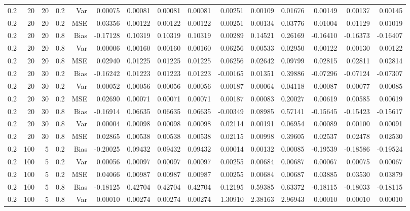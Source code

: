 \begin{table}[!htbp]
\begin{tabular}{lrrrrrrrrrrrrrr}
0.2 &  20 & 20 & 0.2 & Var & 0.00075 & 0.00081 & 0.00081 & 0.00081 & 0.00251 & 0.00109 & 0.01676 & 0.00149 & 0.00137 & 0.00145 \\
0.2 &  20 & 20 & 0.2 & MSE & 0.03356 & 0.00122 & 0.00122 & 0.00122 & 0.00251 & 0.00134 & 0.03776 & 0.01004 & 0.01129 & 0.01019 \\
0.2 &  20 & 20 & 0.8 & Bias & -0.17128 & 0.10319 & 0.10319 & 0.10319 & 0.00289 & 0.14521 & 0.26169 & -0.16410 & -0.16373 & -0.16407 \\
0.2 &  20 & 20 & 0.8 & Var & 0.00006 & 0.00160 & 0.00160 & 0.00160 & 0.06256 & 0.00533 & 0.02950 & 0.00122 & 0.00130 & 0.00122 \\
0.2 &  20 & 20 & 0.8 & MSE & 0.02940 & 0.01225 & 0.01225 & 0.01225 & 0.06256 & 0.02642 & 0.09799 & 0.02815 & 0.02811 & 0.02814 \\
0.2 &  20 & 30 & 0.2 & Bias & -0.16242 & 0.01223 & 0.01223 & 0.01223 & -0.00165 & 0.01351 & 0.39886 & -0.07296 & -0.07124 & -0.07307 \\
0.2 &  20 & 30 & 0.2 & Var & 0.00052 & 0.00056 & 0.00056 & 0.00056 & 0.00187 & 0.00064 & 0.04118 & 0.00087 & 0.00077 & 0.00085 \\
0.2 &  20 & 30 & 0.2 & MSE & 0.02690 & 0.00071 & 0.00071 & 0.00071 & 0.00187 & 0.00083 & 0.20027 & 0.00619 & 0.00585 & 0.00619 \\
0.2 &  20 & 30 & 0.8 & Bias & -0.16914 & 0.06635 & 0.06635 & 0.06635 & -0.00349 & 0.08985 & 0.57141 & -0.15645 & -0.15423 & -0.15617 \\
0.2 &  20 & 30 & 0.8 & Var & 0.00004 & 0.00098 & 0.00098 & 0.00098 & 0.02114 & 0.00191 & 0.06954 & 0.00089 & 0.00100 & 0.00091 \\
0.2 &  20 & 30 & 0.8 & MSE & 0.02865 & 0.00538 & 0.00538 & 0.00538 & 0.02115 & 0.00998 & 0.39605 & 0.02537 & 0.02478 & 0.02530 \\
0.2 & 100 &  5 & 0.2 & Bias & -0.20025 & 0.09432 & 0.09432 & 0.09432 & 0.00014 & 0.00132 & 0.00085 & -0.19539 & -0.18586 & -0.19524 \\
0.2 & 100 &  5 & 0.2 & Var & 0.00056 & 0.00097 & 0.00097 & 0.00097 & 0.00255 & 0.00684 & 0.00687 & 0.00067 & 0.00075 & 0.00067 \\
0.2 & 100 &  5 & 0.2 & MSE & 0.04066 & 0.00987 & 0.00987 & 0.00987 & 0.00255 & 0.00684 & 0.00687 & 0.03885 & 0.03530 & 0.03879 \\
0.2 & 100 &  5 & 0.8 & Bias & -0.18125 & 0.42704 & 0.42704 & 0.42704 & 0.12195 & 0.59385 & 0.63372 & -0.18115 & -0.18033 & -0.18115 \\
0.2 & 100 &  5 & 0.8 & Var & 0.00010 & 0.00274 & 0.00274 & 0.00274 & 1.30910 & 2.38163 & 2.96943 & 0.00010 & 0.00010 & 0.00010 \\

\end{tabular}
\end{table}
